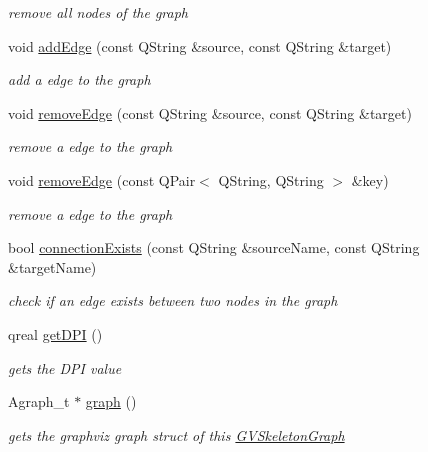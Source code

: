 \begin{DoxyCompactItemize}
\begin{DoxyCompactList}\small\item\em remove all nodes of the graph \end{DoxyCompactList}\item 
void \hyperlink{classGVSkeletonGraph_a509442b926cbb771b3e4273574706f13}{add\+Edge} (const Q\+String \&source, const Q\+String \&target)
\begin{DoxyCompactList}\small\item\em add a edge to the graph \end{DoxyCompactList}\item 
void \hyperlink{classGVSkeletonGraph_a1887eb0a40aadf726468b9baf500e58b}{remove\+Edge} (const Q\+String \&source, const Q\+String \&target)
\begin{DoxyCompactList}\small\item\em remove a edge to the graph \end{DoxyCompactList}\item 
void \hyperlink{classGVSkeletonGraph_a546b14e4c3c48b7d0f4eac84955fd360}{remove\+Edge} (const Q\+Pair$<$ Q\+String, Q\+String $>$ \&key)
\begin{DoxyCompactList}\small\item\em remove a edge to the graph \end{DoxyCompactList}\item 
bool \hyperlink{classGVSkeletonGraph_a50d801a00e3c1761c5eb8425982ed345}{connection\+Exists} (const Q\+String \&source\+Name, const Q\+String \&target\+Name)
\begin{DoxyCompactList}\small\item\em check if an edge exists between two nodes in the graph \end{DoxyCompactList}\item 
qreal \hyperlink{classGVSkeletonGraph_abae4623f9d7c1cf8eb078ddc974d8d67}{get\+D\+P\+I} ()
\begin{DoxyCompactList}\small\item\em gets the D\+P\+I value \end{DoxyCompactList}\item 
Agraph\+\_\+t $\ast$ \hyperlink{classGVSkeletonGraph_ade05624b5ad5afd0567af5a394d47011}{graph} ()
\begin{DoxyCompactList}\small\item\em gets the graphviz graph struct of this \hyperlink{classGVSkeletonGraph}{G\+V\+Skeleton\+Graph} \end{DoxyCompactList}\end{DoxyCompactItemize}
